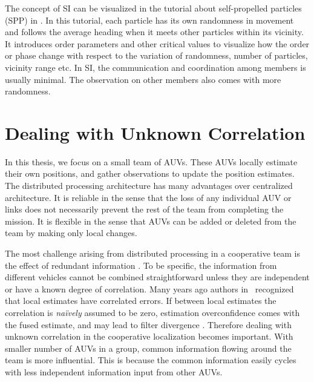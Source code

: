 The concept of SI can be visualized in the tutorial about self-propelled particles (SPP) in \cite{Sam2005}. In this tutorial, each particle has its own randomness in movement and follows the average heading when it meets other particles within its vicinity. It introduces order parameters and other critical values to visualize how the order or phase change with respect to the variation of randomness, number of particles, vicinity range etc. In SI, the communication and coordination among members is usually minimal. The observation on other members also comes with more randomness.

\section{Dealing with Unknown Correlation}
\label{sec:unknowncorrelation}
In this thesis, we focus on a small team of AUVs. These AUVs locally estimate their own positions, and gather observations to update the position estimates. The distributed processing architecture has many advantages over centralized architecture. It is reliable in the sense that the loss of any individual AUV or links does not necessarily prevent the rest of the team from completing the mission. It is flexible in the sense that AUVs can be added or deleted from the team by making only local changes. 

The most challenge arising from distributed processing in a cooperative team is the effect of redundant information \cite{GRIME1994849}. To be specific, the information from different vehicles cannot be combined straightforward unless they are independent or have a known degree of correlation. Many years ago authors in~\cite{Bar-Shalom1986} recognized that local estimates have correlated errors. If between local estimates the correlation is \textit{na\"ively} assumed to be zero, estimation overconfidence comes with the fused estimate, and may lead to filter divergence \cite{Julier1997}. Therefore dealing with unknown correlation in the cooperative localization becomes important. With smaller number of AUVs in a group, common information flowing around the team is more influential. This is because the common information easily cycles with less independent information input from other AUVs.

